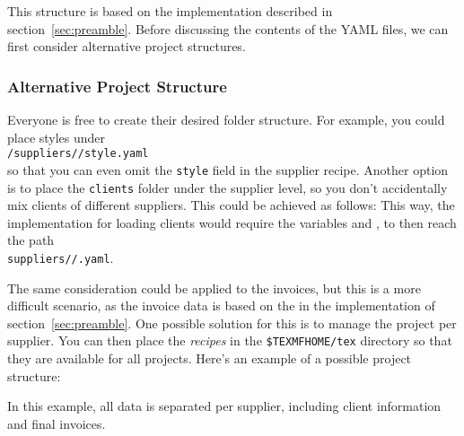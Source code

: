This structure is based on the implementation described in section~\ref{sec:preamble}.
Before discussing the contents of the YAML files, we can first consider alternative project structures.

\subsubsection{Alternative Project Structure}
Everyone is free to create their desired folder structure.
For example, you could place styles under\\
\hspace*{4em}\texttt{/suppliers//style.yaml}\\
so that you can even omit the \texttt{style} field in the supplier recipe.
Another option is to place the \texttt{clients} folder under the supplier level, so you don't accidentally mix clients of different suppliers.
This could be achieved as follows:
\noindent
This way, the implementation for loading clients would require the variables  and , to then reach the path\\
\hspace*{4em}\texttt{suppliers//.yaml}.

The same consideration could be applied to the invoices, but this is a more difficult scenario, as the invoice data is based on the  in the implementation of section~\ref{sec:preamble}.
One possible solution for this is to manage the project per supplier.
You can then place the \textit{recipes} in the \texttt{\$TEXMFHOME/tex} directory so that they are available for all projects.
Here's an example of a possible project structure:\\
\begin{minipage}{.49\linewidth}
\end{minipage}%
\hfill
\begin{minipage}{.49\linewidth}
\end{minipage}
In this example, all data is separated per supplier, including client information and final invoices.

